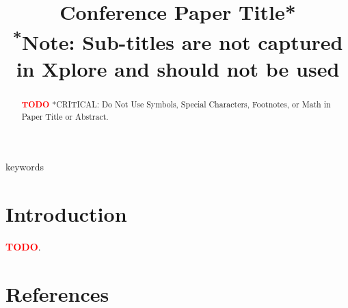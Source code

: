 \documentclass[conference]{IEEEtran}
\newcommand{\TODO}[1]{\textbf{\textcolor{red}{#1}}\xspace}
\newcommand{\TODOB}{\TODO{TODO}\xspace}
\begin{document}
\title{Conference Paper Title*\\
{\footnotesize \textsuperscript{*}Note: Sub-titles are not captured in Xplore and
should not be used}
}

\author{
\and
{}
}

\maketitle


\begin{abstract}
\TODOB
*CRITICAL: Do Not Use Symbols, Special Characters, Footnotes, or Math in Paper Title or
Abstract.
\end{abstract}

\begin{IEEEkeywords}
keywords
\end{IEEEkeywords}

\section{Introduction}
\label{sec:Introduction}

\TODOB\cite{test}.

\section{References}
\label{sec:References}
\end{document}
